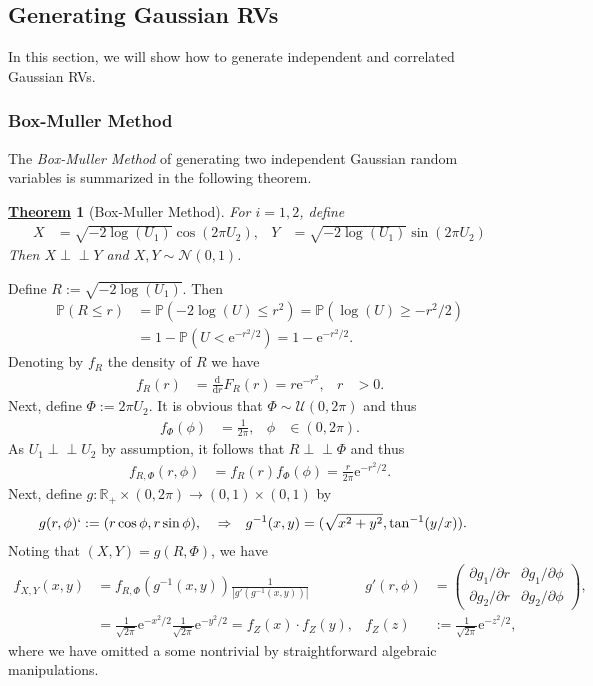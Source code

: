 \documentclass[12pt]{book}
\numberwithin{equation}{chapter}
\theoremstyle{plain}
\newtheorem{theorem}{\underline{Theorem}}
\numberwithin{theorem}{section}
\theoremstyle{definition}
\numberwithin{exercise}{chapter}
\let\oldendproof\endproof
\renewenvironment{proof}[1][\proofname]{%
  \oldproof[\scshape\underline{#1}]%
}{\oldendproof}
\newcommand{\<}{\langle}
\renewcommand{\>}{\rangle}
\renewcommand{\(}{\left(}
\renewcommand{\)}{\right)}
\renewcommand{\[}{\left[}
\renewcommand{\]}{\right]}
\newcommand\Pb{\mathds{P}}
\newcommand\Rb{\mathds{R}}
\newcommand\Nc{\mathscr{N}}
\newcommand\Uc{\mathscr{U}}
\renewcommand\d{\partial}
\newcommand{\ind}{\perp \! \! \! \perp}
\newcommand\dd{\mathrm{d}}
\newcommand\ee{\mathrm{e}}
\begin{document}
\subsection{Generating Gaussian RVs}
In this section, we will show how to generate independent and correlated Gaussian RVs.

\subsubsection{Box-Muller Method}
The \emph{Box-Muller Method} of generating two independent Gaussian random variables is summarized in the following theorem.
\begin{theorem}[Box-Muller Method]
\label{thm:bmm}
For $i=1,2$, define
\begin{align}
X
	&=	\sqrt{- 2 \log (U_1)} \cos (2 \pi U_2), &
Y
	&=	\sqrt{- 2 \log (U_1)} \sin (2 \pi U_2)
\end{align}
Then $X \ind Y$ and $X,Y \sim \Nc(0,1)$.
\end{theorem}
\begin{proof}
Define $R := \sqrt{ - 2 \log (U_1) }$.  Then
\begin{align}
\Pb( R \leq r )
	&=	\Pb( - 2 \log(U) \leq r^2)
	=		\Pb( \log(U) \geq - r^2/2 ) \\
	&=		1 - \Pb( U < \ee^{-r^2/2} )
	=		1 - \ee^{-r^2/2} .
\end{align}
Denoting by $f_R$ the density of $R$ we have
\begin{align}
f_R(r)
	&=	\frac{\dd}{\dd r} F_R(r) = r \ee^{-r^2} , &
r
	&> 0 .
\end{align}
Next, define $\Phi := 2 \pi U_2$.  It is obvious that $\Phi \sim \Uc(0,2\pi)$ and thus
\begin{align}
f_\Phi(\phi)
	&=	\frac{1}{2\pi} , &
\phi
	&\in (0,2\pi) .
\end{align}
As $U_1 \ind U_2$ by assumption, it follows that $R \ind \Phi$ and thus
\begin{align}
f_{R,\Phi}(r,\phi)
	&=	f_R(r) f_\Phi(\phi) = \frac{r}{2\pi}\ee^{-r^2/2} .
\end{align}
Next, define $g : \Rb_+ \times (0,2\pi) \to (0,1) \times (0,1)$ by
\begin{align}
g(r, \phi)
`	&:=	( r \cos \phi, r \sin \phi ) , &
	&\Rightarrow&
g^{-1}(x,y)
	&=	( \sqrt{ x^2 + y^2 } , \tan^{-1}(y/x) ) .
\end{align}
Noting that $(X,Y) =	g(R,\Phi)$, we have
\begin{align}
f_{X,Y}(x,y)
	&=	f_{R,\Phi}( g^{-1}(x,y) ) \frac{1}{ | g'(g^{-1}(x,y) ) | } &
g'(r,\phi)
	&=	\( \begin{array}{cc}
			\d g_1 / \d r & \d g_1 / \d \phi \\
			\d g_2 / \d r & \d g_2 / \d \phi
			\end{array} \) , \\
	&=	\frac{1}{\sqrt{2\pi}} \ee^{-x^2/2} \frac{1}{\sqrt{2\pi}} \ee^{-y^2/2}
	=		f_Z(x) \cdot f_Z(y) , &
f_Z(z)
	&:=	\frac{1}{\sqrt{2\pi}} \ee^{-z^2/2} ,
\end{align}
where we have omitted a some nontrivial by straightforward algebraic manipulations.
\end{proof}
\end{document}
